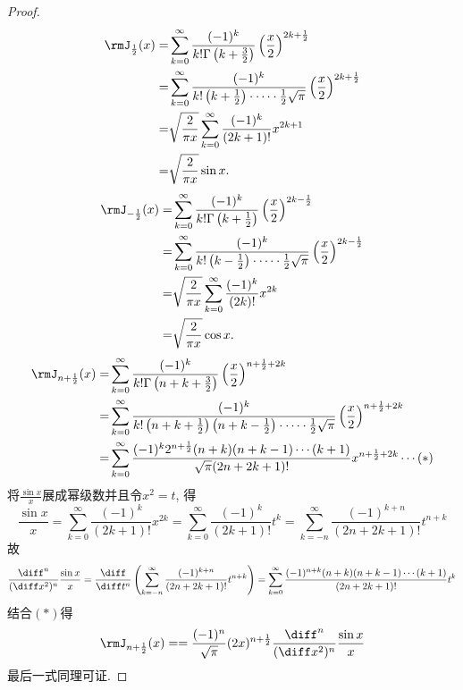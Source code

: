 \begin{proof}\[\begin{split}
\rmJ_{\frac{1}{2}}(x)=&\sum_{k=0}^{\infty}\frac{(-1)^k}{k!\Gamma\left(k+\frac{3}{2}\right)}\left(\frac{x}{2}\right)^{2k+\frac{1}{2}}\\
=&\sum_{k=0}^{\infty}\frac{(-1)^k}{k!\left(k+\frac{1}{2}\right)\cdot\cdots\cdot\frac{1}{2}\sqrt{\pi}}\left(\frac{x}{2}\right)^{2k+\frac{1}{2}}\\
=&\sqrt{\frac{2}{\pi x}}\sum_{k=0}^{\infty}\frac{(-1)^k}{(2k+1)!}x^{2k+1}\\
=&\sqrt{\frac{2}{\pi x}}\sin x.
\end{split}\]
\[\begin{split}\rmJ_{-\frac{1}{2}}(x)=&\sum_{k=0}^{\infty}\frac{(-1)^k}{k!\Gamma\left(k+\frac{1}{2}\right)}\left(\frac{x}{2}\right)^{2k-\frac{1}{2}}\\
=&\sum_{k=0}^{\infty}\frac{(-1)^k}{k!\left(k-\frac{1}{2}\right)\cdot\cdots\cdot\frac{1}{2}\sqrt{\pi}}\left(\frac{x}{2}\right)^{2k-\frac{1}{2}}\\
=&\sqrt{\frac{2}{\pi x}}\sum_{k=0}^{\infty}\frac{(-1)^k}{(2k)!}x^{2k}\\
=&\sqrt{\frac{2}{\pi x}}\cos x.
\end{split}\]
\[\begin{split}
\rmJ_{n+\frac{1}{2}}(x)=&\sum_{k=0}^{\infty}\frac{(-1)^k}{k!\Gamma\left(n+k+\frac{3}{2}\right)}\left(\frac{x}{2}\right)^{n+\frac{1}{2}+2k}\\
=&\sum_{k=0}^{\infty}\frac{(-1)^k}{k!\left(n+k+\frac{1}{2}\right)\left(n+k-\frac{1}{2}\right)\cdot\cdots\cdot\frac{1}{2}\sqrt{\pi}}\left(\frac{x}{2}\right)^{n+\frac{1}{2}+2k}\\
=&\sum_{k=0}^{\infty}\frac{(-1)^k2^{n+\frac{1}{2}}(n+k)(n+k-1)\cdots(k+1)}{\sqrt{\pi}(2n+2k+1)!}x^{n+\frac{1}{2}+2k}\cdots(*)
\end{split}\]
将$\frac{\sin x}{x}$展成幂级数并且令$x^2=t$, 得
\[\frac{\sin x}{x}=\sum_{k=0}^{\infty}\frac{(-1)^k}{(2k+1)!}x^{2k}=\sum_{k=0}^{\infty}\frac{(-1)^k}{(2k+1)!}t^k=\sum_{k=-n}^{\infty}\frac{(-1)^{k+n}}{(2n+2k+1)!}t^{n+k}\]
故
\[\frac{\diff^n}{(\diff x^2)^n}\frac{\sin x}{x}=\frac{\diff}{\diff t^n}\left(\sum_{k=-n}^{\infty}\frac{(-1)^{k+n}}{(2n+2k+1)!}t^{n+k}\right)=\sum_{k=0}^{\infty}\frac{(-1)^{n+k}(n+k)(n+k-1)\cdots(k+1)}{(2n+2k+1)!}t^k\]
结合$(*)$得
\[\rmJ_{n+\frac{1}{2}}(x)==\frac{(-1)^n}{\sqrt{\pi}}(2x)^{n+\frac{1}{2}}\frac{\diff^n}{(\diff x^2)^n}\frac{\sin x}{x}\]
最后一式同理可证.
\end{proof}


